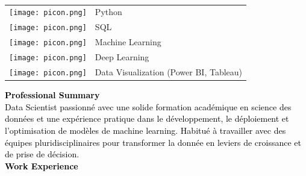 \documentclass{article}
\begin{document}
\begin{paracol}{2}
        \vspace{.4cm}

        {\color{black}{Key Skills}}

        ~
        
        \begin{tabular}{ll}
         \begin{minipage}{0.1\linewidth}
         \texttt{[image: picon.png]}
         \end{minipage} & {Python} \\[10pt]
         \begin{minipage}{0.1\linewidth}
         \texttt{[image: picon.png]}
         \end{minipage} & {SQL} \\[10pt]
         \begin{minipage}{0.1\linewidth}
         \texttt{[image: picon.png]}
         \end{minipage} & {Machine Learning} \\[10pt]
         \begin{minipage}{0.1\linewidth}
         \texttt{[image: picon.png]}
         \end{minipage} & {Deep Learning} \\[10pt]
         \begin{minipage}{0.1\linewidth}
         \texttt{[image: picon.png]}
         \end{minipage} & {Data Visualization (Power BI, Tableau)} \\[10pt]
        \end{tabular}
        
\switchcolumn
\color{black}

\textcolor{black}{\Large \textbf{Professional Summary}} \\

\textcolor{black}{Data Scientist passionné avec une solide formation académique en science des données et une expérience pratique dans le développement, le déploiement et l’optimisation de modèles de machine learning. Habitué à travailler avec des équipes pluridisciplinaires pour transformer la donnée en leviers de croissance et de prise de décision.}\\[8pt]

\textcolor{black}{\Large \textbf{Work Experience}} \\


\end{paracol}
\end{document}
